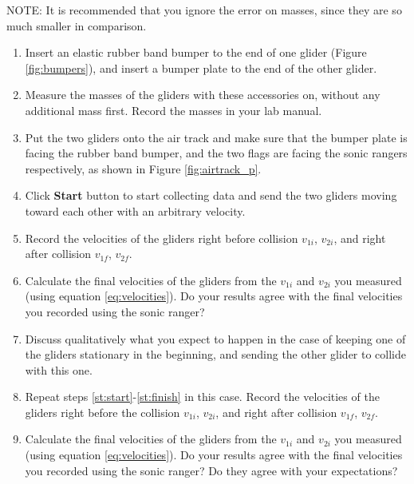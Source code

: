 NOTE:  It is recommended that you ignore the error on masses, since they are so much smaller in comparison.

\begin{enumerate}
\item Insert an elastic rubber band bumper to the end of one glider (Figure \ref{fig:bumpers}), and insert a bumper plate to the end of the other glider.
\item Measure the masses of the gliders with these accessories on, without any additional mass first. Record the masses in your lab manual. 
\item Put the two gliders onto the air track and make sure that the bumper plate is facing the rubber band bumper, and the two flags are facing the sonic rangers respectively, as shown in Figure \ref{fig:airtrack_p}.\label{st:start}
\item Click \textbf{Start} button to start collecting data and send the two gliders moving toward each other with an arbitrary velocity.
\item Record the velocities of the gliders right before collision $v_{1i}$, $v_{2i}$, and right after collision $v_{1f}$, $v_{2f}$.
    \item Calculate the final velocities of the gliders from the $v_{1i}$ and $v_{2i}$ you measured (using equation \ref{eq:velocities}). Do your results agree with the final velocities you recorded using the sonic ranger?  \label{st:finish} 


\item Discuss qualitatively what you expect to happen in the case of keeping one of the gliders stationary in the beginning, and sending the other glider to collide with this one.
\item Repeat steps \ref{st:start}-\ref{st:finish} in this case. Record the velocities of the gliders right before the collision $v_{1i}$, $v_{2i}$, and right after collision $v_{1f}$, $v_{2f}$.
    \item Calculate the final velocities of the gliders from the $v_{1i}$ and $v_{2i}$ you measured (using equation \ref{eq:velocities}). Do your results agree with the final velocities you recorded using the sonic ranger? Do they agree with your expectations?


\end{enumerate}
